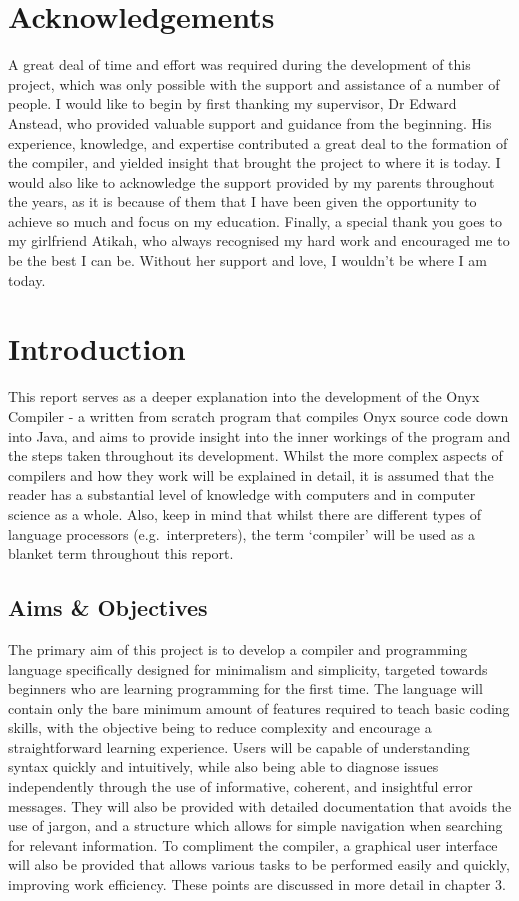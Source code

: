 \documentclass[
]{report}
\begin{document}
\chapter*{Acknowledgements}
A great deal of time and effort was required during the development of
this project, which was only possible with the support and assistance of
a number of people. I would like to begin by first thanking my
supervisor, Dr Edward Anstead, who provided valuable support and
guidance from the beginning. His experience, knowledge, and expertise
contributed a great deal to the formation of the compiler, and yielded
insight that brought the project to where it is today. I would also like
to acknowledge the support provided by my parents throughout the years,
as it is because of them that I have been given the opportunity to
achieve so much and focus on my education. Finally, a special thank you
goes to my girlfriend Atikah, who always recognised my hard work and
encouraged me to be the best I can be. Without her support and love, I
wouldn't be where I am today.

\setcounter{tocdepth}{2}
\tableofcontents

\chapter{Introduction}
This report serves as a deeper explanation into the development of the
Onyx Compiler - a written from scratch program that compiles Onyx source
code down into Java, and aims to provide insight into the inner workings
of the program and the steps taken throughout its development. Whilst
the more complex aspects of compilers and how they work will be
explained in detail, it is assumed that the reader has a substantial
level of knowledge with computers and in computer science as a whole.
Also, keep in mind that whilst there are different types of language
processors (e.g.~interpreters), the term `compiler' will be used as a
blanket term throughout this report.

\section{Aims \& Objectives}
The primary aim of this project is to develop a compiler and programming
language specifically designed for minimalism and simplicity, targeted
towards beginners who are learning programming for the first time. The
language will contain only the bare minimum amount of features required
to teach basic coding skills, with the objective being to reduce
complexity and encourage a straightforward learning experience. Users
will be capable of understanding syntax quickly and intuitively, while
also being able to diagnose issues independently through the use of
informative, coherent, and insightful error messages. They will also be
provided with detailed documentation that avoids the use of jargon, and
a structure which allows for simple navigation when searching for
relevant information. To compliment the compiler, a graphical user
interface will also be provided that allows various tasks to be
performed easily and quickly, improving work efficiency. These points
are discussed in more detail in chapter 3.
\end{document}
